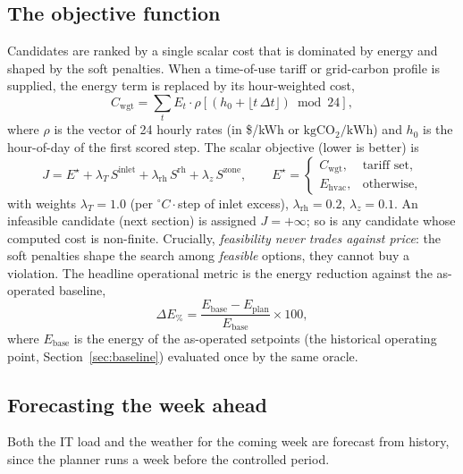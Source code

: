 \documentclass[11pt]{article}
\newcommand{\degC}{\ensuremath{^{\circ}}C}
\newcommand{\Esum}{E_{\mathrm{hvac}}}
\begin{document}
\subsection{The objective function}
\label{sec:objective}
Candidates are ranked by a single scalar cost that is dominated by energy and shaped by
the soft penalties. When a time-of-use tariff or grid-carbon profile is supplied, the
energy term is replaced by its hour-weighted cost,
\begin{equation}
C_{\mathrm{wgt}} = \sum_t E_t \cdot \rho\!\left[(h_0 + \lfloor t\,\Delta t\rfloor)\bmod 24\right],
\label{eq:cost}
\end{equation}
where \(\rho\) is the vector of 24 hourly rates (in \$/kWh or \(\mathrm{kgCO_2/kWh}\)) and
\(h_0\) is the hour-of-day of the first scored step. The scalar objective (lower is
better) is
\begin{equation}
J = E^{\star} + \lambda_T\,S^{\mathrm{inlet}} + \lambda_{\mathrm{rh}}\,S^{\mathrm{rh}} + \lambda_z\,S^{\mathrm{zone}},
\qquad
E^{\star} = \begin{cases} C_{\mathrm{wgt}}, & \text{tariff set,}\\ \Esum, & \text{otherwise,}\end{cases}
\label{eq:objective}
\end{equation}
with weights \(\lambda_T=1.0\) (per \(\degC{\cdot}\)step of inlet excess),
\(\lambda_{\mathrm{rh}}=0.2\), \(\lambda_z=0.1\). An infeasible candidate (next section)
is assigned \(J=+\infty\); so is any candidate whose computed cost is non-finite. Crucially,
\emph{feasibility never trades against price}: the soft penalties shape the search among
\emph{feasible} options, they cannot buy a violation. The headline operational metric is
the energy reduction against the as-operated baseline,
\begin{equation}
\Delta E_{\%} = \frac{E_{\mathrm{base}} - E_{\mathrm{plan}}}{E_{\mathrm{base}}}\times 100,
\label{eq:reduction}
\end{equation}
where \(E_{\mathrm{base}}\) is the energy of the as-operated setpoints (the historical
operating point, Section~\ref{sec:baseline}) evaluated once by the same oracle.

\subsection{Forecasting the week ahead}
\label{sec:forecaster}
Both the IT load and the weather for the coming week are forecast from history, since the
planner runs a week before the controlled period.
\end{document}
